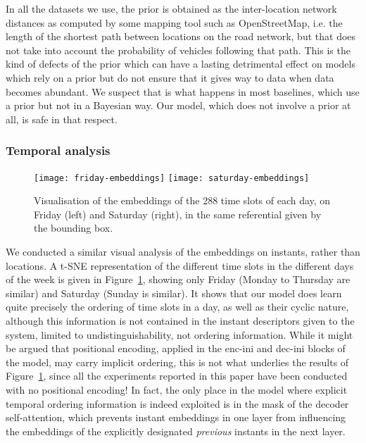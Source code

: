 \documentclass[a4paper]{article}
\begin{document}
In all the datasets we use, the prior is obtained as the inter-location network distances as computed by some mapping tool such as OpenStreetMap, i.e. the length of the shortest path between locations on the road network, but that does not take into account the probability of vehicles following that path. This is the kind of defects of the prior which can have a lasting detrimental effect on models which rely on a prior but do not ensure that it gives way to data when data becomes abundant. We suspect that is what happens in most baselines, which use a prior but not in a Bayesian way. Our model, which does not involve a prior at all, is safe in that respect.
\subsubsection{Temporal analysis}
\begin{figure}
\begin{center}
\texttt{[image: friday-embeddings]}
\texttt{[image: saturday-embeddings]}
\end{center}
\caption{\label{fig:instant-embeddings}Visualisation of the embeddings of the 288 time slots of each day, on Friday (left) and Saturday (right), in the same referential given by the bounding box.}
\end{figure}
We conducted a similar visual analysis of the embeddings on instants, rather than locations. A t-SNE representation of the different time slots in the different days of the week is given in Figure~\ref{fig:instant-embeddings}, showing only Friday (Monday to Thursday are similar) and Saturday (Sunday is similar). It shows that our model does learn quite precisely the ordering of time slots in a day, as well as their cyclic nature, although this information is not contained in the instant descriptors given to the system, limited to undistinguishability, not ordering information. While it might be argued that positional encoding, applied in the {\sc enc-ini} and {\sc dec-ini} blocks of the model, may carry implicit ordering, this is not what underlies the results of Figure~\ref{fig:instant-embeddings}, since all the experiments reported in this paper have been conducted with no positional encoding! In fact, the only place in the model where explicit temporal ordering information is indeed exploited is in the mask of the decoder self-attention, which prevents instant embeddings in one layer from influencing the embeddings of the explicitly designated {\em previous} instants in the next layer.
\end{document}
